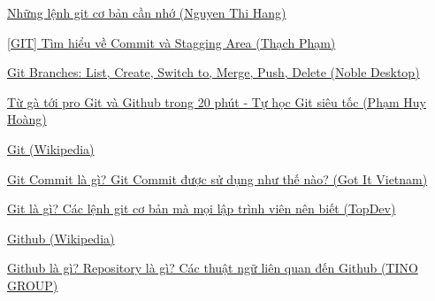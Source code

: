 \documentclass[a4paper]{report}
\begin{document}
\begin{thebibliography}{2}
\href{https://viblo.asia/p/nhung-lenh-git-co-ban-can-nho-V3m5W1OyZO7}{Những lệnh git cơ bản cần nhớ (Nguyen Thi Hang)}

\href{https://thachpham.com/tools/hieu-them-ve-commit-va-staging-area-git.html}{[GIT] Tìm hiểu về Commit và Stagging Area (Thạch Phạm)}

\href{https://www.nobledesktop.com/learn/git/git-branches}{Git Branches: List, Create, Switch to, Merge, Push, Delete (Noble Desktop)}

\href{https://www.youtube.com/watch?v=1JuYQgpbrW0&t=515s}{Từ gà tới pro Git và Github trong 20 phút - Tự học Git siêu tốc (Phạm Huy Hoàng)}

\href{https://vi.wikipedia.org/wiki/Git_(ph%E1%BA%A7n_m%E1%BB%81m)}{Git (Wikipedia)}

\href{https://vn.got-it.ai/blog/git-commit-la-gi-git-commit-duoc-su-dung-nhu-the-nao}{Git Commit là gì? Git Commit được sử dụng như thế nào? (Got It Vietnam)}

\href{https://topdev.vn/blog/git-la-gi/#git-co-loi-ich-gi}{Git là gì? Các lệnh git cơ bản mà mọi lập trình viên nên biết (TopDev)}

\href{https://vi.wikipedia.org/wiki/GitHub#:~:text=S%E1%BB%B1%20ph%C3%A1t%20tri%E1%BB%83n%20c%E1%BB%A7a%20n%E1%BB%81n,xem%20nh%C6%B0%20giai%20%C4%91o%E1%BA%A1n%20beta..}{Github (Wikipedia)}

\href{https://wiki.tino.org/repository-la-gi/}{Github là gì? Repository là gì? Các thuật ngữ liên quan đến Github (TINO GROUP)}
\end{thebibliography}
\end{document}
